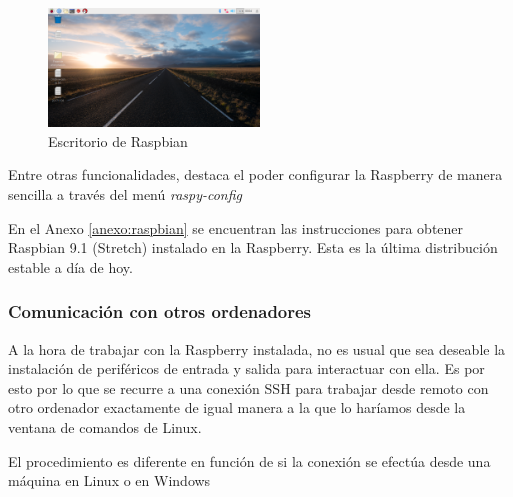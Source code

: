 \begin{figure}[tb]
\centering
\includegraphics[width=0.5\textwidth]{figuras/Raspbian.png}
\caption{Escritorio de Raspbian}
\label{fig:raspbian}
\end{figure}

Entre otras funcionalidades, destaca el poder configurar la Raspberry de manera sencilla a través del menú \textit{raspy-config}

En el Anexo \ref{anexo:raspbian} se encuentran las instrucciones para obtener Raspbian 9.1 (Stretch) instalado en la Raspberry. Esta es la última distribución estable a día de hoy.

\subsubsection{Comunicación con otros ordenadores}


A la hora de trabajar con la Raspberry instalada, no es usual que sea deseable la instalación de periféricos de entrada y salida para interactuar con ella. Es por esto por lo que se recurre a una conexión SSH para trabajar desde remoto con otro ordenador exactamente de igual manera a la que lo haríamos desde la ventana de comandos de Linux.

El procedimiento es diferente en función de si la conexión se efectúa desde una máquina en Linux o en Windows

